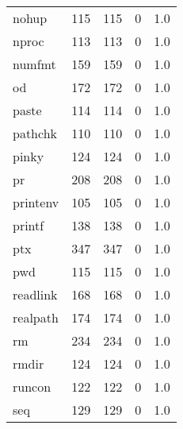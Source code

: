 \begin{longtable}{lrrrr}
nohup     &                     115 &              115 &                 0 &                          1.0 \\
nproc     &                     113 &              113 &                 0 &                          1.0 \\
numfmt    &                     159 &              159 &                 0 &                          1.0 \\
od        &                     172 &              172 &                 0 &                          1.0 \\
paste     &                     114 &              114 &                 0 &                          1.0 \\
pathchk   &                     110 &              110 &                 0 &                          1.0 \\
pinky     &                     124 &              124 &                 0 &                          1.0 \\
pr        &                     208 &              208 &                 0 &                          1.0 \\
printenv  &                     105 &              105 &                 0 &                          1.0 \\
printf    &                     138 &              138 &                 0 &                          1.0 \\
ptx       &                     347 &              347 &                 0 &                          1.0 \\
pwd       &                     115 &              115 &                 0 &                          1.0 \\
readlink  &                     168 &              168 &                 0 &                          1.0 \\
realpath  &                     174 &              174 &                 0 &                          1.0 \\
rm        &                     234 &              234 &                 0 &                          1.0 \\
rmdir     &                     124 &              124 &                 0 &                          1.0 \\
runcon    &                     122 &              122 &                 0 &                          1.0 \\
seq       &                     129 &              129 &                 0 &                          1.0 \\

\end{longtable}

